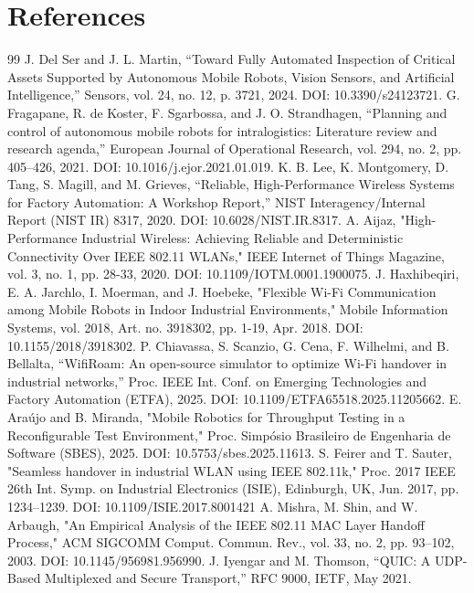 \documentclass[preprint,11pt]{elsarticle}
\begin{document}
\section*{References}
\begin{thebibliography}{99}
 J. Del Ser and J. L. Martin, ``Toward Fully Automated Inspection of Critical Assets Supported by Autonomous Mobile Robots, Vision Sensors, and Artificial Intelligence,'' Sensors, vol. 24, no. 12, p. 3721, 2024. DOI: 10.3390/s24123721.
 G. Fragapane, R. de Koster, F. Sgarbossa, and J. O. Strandhagen, ``Planning and control of autonomous mobile robots for intralogistics: Literature review and research agenda,'' European Journal of Operational Research, vol. 294, no. 2, pp. 405--426, 2021. DOI: 10.1016/j.ejor.2021.01.019.
 K. B. Lee, K. Montgomery, D. Tang, S. Magill, and M. Grieves, ``Reliable, High-Performance Wireless Systems for Factory Automation: A Workshop Report,'' NIST Interagency/Internal Report (NIST IR) 8317, 2020. DOI: 10.6028/NIST.IR.8317.
 A. Aijaz, "High-Performance Industrial Wireless: Achieving Reliable and Deterministic Connectivity Over IEEE 802.11 WLANs," IEEE Internet of Things Magazine, vol. 3, no. 1, pp. 28-33, 2020. DOI: 10.1109/IOTM.0001.1900075.
 J. Haxhibeqiri, E. A. Jarchlo, I. Moerman, and J. Hoebeke, "Flexible Wi-Fi Communication among Mobile Robots in Indoor Industrial Environments," Mobile Information Systems, vol. 2018, Art. no. 3918302, pp. 1-19, Apr. 2018. DOI: 10.1155/2018/3918302.
 P. Chiavassa, S. Scanzio, G. Cena, F. Wilhelmi, and B. Bellalta, ``WifiRoam: An open-source simulator to optimize Wi-Fi handover in industrial networks,'' Proc. IEEE Int. Conf. on Emerging Technologies and Factory Automation (ETFA), 2025. DOI: 10.1109/ETFA65518.2025.11205662.
 E. Araújo and B. Miranda, "Mobile Robotics for Throughput Testing in a Reconfigurable Test Environment," Proc. Simpósio Brasileiro de Engenharia de Software (SBES), 2025. DOI: 10.5753/sbes.2025.11613.
 S. Feirer and T. Sauter, "Seamless handover in industrial WLAN using IEEE 802.11k," Proc. 2017 IEEE 26th Int. Symp. on Industrial Electronics (ISIE), Edinburgh, UK, Jun. 2017, pp. 1234--1239. DOI: 10.1109/ISIE.2017.8001421
 A. Mishra, M. Shin, and W. Arbaugh, "An Empirical Analysis of the IEEE 802.11 MAC Layer Handoff Process," ACM SIGCOMM Comput. Commun. Rev., vol. 33, no. 2, pp. 93--102, 2003. DOI: 10.1145/956981.956990.
 J. Iyengar and M. Thomson, ``QUIC: A UDP-Based Multiplexed and Secure Transport,'' RFC 9000, IETF, May 2021.

\end{thebibliography}
\end{document}
